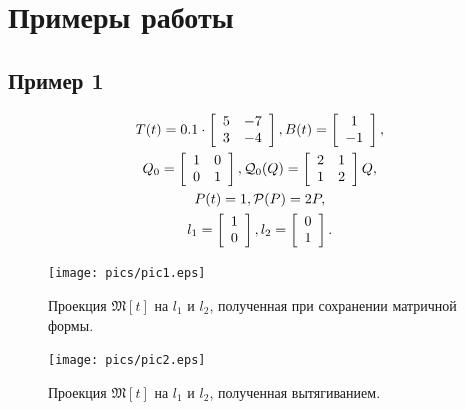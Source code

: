 \documentclass[12pt]{article}
\theoremstyle{rusdef}
\begin{document}
\section{Примеры работы}
\subsection{Пример 1}
\begin{gather}
T(t) = 0.1 \cdot \left[
\begin{array}{cccc}
5 & -7 \\
3 & -4
\end{array}
\right],
B(t) = \left[
\begin{array}{cccc}
1 \\
-1
\end{array}
\right], \notag \\
Q_0 = \left[
\begin{array}{cccc}
1 & 0 \\
0 & 1
\end{array}
\right],
\mathcal{Q}_0(Q) = \left[
\begin{array}{cccc}
2 & 1 \\
1 & 2
\end{array}
\right] Q, \notag \\
P(t) = 1,
\mathcal{P}(P) = 2P, \notag \\
l_1 = \left[
\begin{array}{cccc}
1 \\
0
\end{array}
\right],
l_2 = \left[
\begin{array}{cccc}
0 \\
1
\end{array}
\right]. \notag
\end{gather}

\begin{figure}[p]
	\centering
	\texttt{[image: pics/pic1.eps]}
	\caption{Проекция $\mathfrak{M}[t]$ на $l_1$ и $l_2$, полученная при сохранении матричной формы.}
	\label{pic1}
\end{figure}

\begin{figure}[p]
	\centering
	\texttt{[image: pics/pic2.eps]}
	\caption{Проекция $\mathfrak{M}[t]$ на $l_1$ и $l_2$, полученная вытягиванием.}
	\label{pic2}
\end{figure}

\newpage
\end{document}
